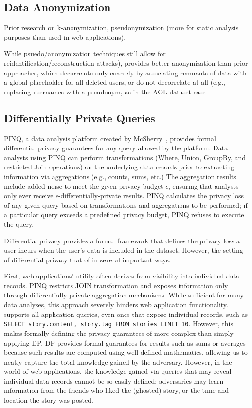 \subsection{Data Anonymization}

Prior research on k-anonymization, pseudonymization (more for static analysis purposes than used in
web applications).

While psuedo/anonymization
techniques still allow for reidentification/reconstruction attacks), \sys{} provides better
anonymization than prior approaches, which decorrelate only coarsely by associating remnants of data
with a global placeholder for all deleted users, or do not decorrelate at all (e.g., replacing
usernames with a pseudonym, as in the AOL dataset case~%

\subsection{Differentially Private Queries}

PINQ, a data analysis platform created by McSherry~\cite{pinq}, provides formal differential privacy
guarantees for any query allowed by the platform.  Data analysts using PINQ can perform
transformations (Where, Union, GroupBy, and restricted Join operations) on the underlying data
records prior to extracting information via aggregations (e.g., counts, sums, etc.) The aggregation
results include added noise to meet the given privacy budget $\epsilon$, ensuring that analysts only
ever receive $\epsilon$-differentially-private results.  PINQ calculates the privacy loss of any
given query based on transformations and aggregations to be performed; if a particular query exceeds
a predefined privacy budget, PINQ refuses to execute the query.

Differential privacy provides a formal framework that defines the privacy loss a user incurs
when the user's data is included in the dataset. However, the setting of differential privacy
that of \sys{} in several important ways. 

First, web applications' utility often derives from visibility into individual data records. PINQ
restricts JOIN transformation and exposes information only through differentially-private
aggregation mechanisms. While sufficient for many data analyses, this approach severely hinders web
application functionality. \sys{} supports all application queries, even ones that expose individual
records, such as \texttt{SELECT story.content, story.tag FROM stories LIMIT 10}.  
However, this makes formally defining the privacy guarantees of \sys{} more complex than
simply applying DP.  DP provides formal guarantees for results such as sums or averages because such
results are computed using well-defined mathematics, allowing us to neatly capture the total
knowledge gained by the adversary. However, in the world of web applications, the knowledge gained
via queries that may reveal individual data records cannot be so easily defined: adversaries may
learn information from the friends who liked the (ghosted) story, or the time and location the story
was posted.

